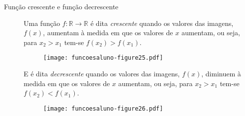 \documentclass[extrafontsizes, twoside, 11pt, openright, final]{memoir}
\begin{document}
\begin{description}
	\item[{Função crescente e função decrescente}] \leavevmode{}\label{\detokenize{AF106-5:term-funcao-crescente-e-funcao-decrescente}}
		Uma função $f: \mathbb{R} \to \mathbb{R}$ é dita \emph{crescente} quando os valores das imagens, $f(x)$, aumentam à medida em que os valores de $x$ aumentam, ou seja, para $x_2>x_1$ tem-se $f(x_2)>f(x_1)$.

		\begin{figure}[H]
			\begin{center}
				\centering

				\texttt{[image: funcoesaluno-figure25.pdf]}
			\end{center}
		\end{figure}

		E é dita \emph{decrescente} quando os valores das imagens, $f(x)$, diminuem à medida em que os valores de $x$ aumentam, ou seja, para $x_2>x_1$ tem-se $f(x_2)<f(x_1)$.
		\begin{figure}[H]
			\begin{center}
				\centering

				\texttt{[image: funcoesaluno-figure26.pdf]}
			\end{center}
		\end{figure}

\end{description}
\end{document}
